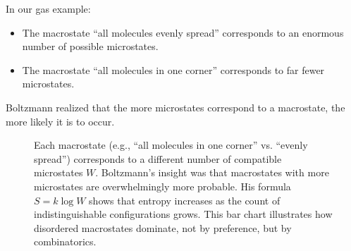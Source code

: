 In our gas example:
\begin{itemize}
  \item The macrostate “all molecules evenly spread” corresponds to an enormous number of possible microstates.
  \item The macrostate “all molecules in one corner” corresponds to far fewer microstates.
\end{itemize}

Boltzmann realized that the more microstates correspond to a macrostate, the more likely it is to occur. 






\begin{figure}[H]
\centering
{}
\caption{
Each macrostate (e.g., “all molecules in one corner” vs. “evenly spread”) corresponds to a different number of compatible microstates \( W \). Boltzmann’s insight was that macrostates with more microstates are overwhelmingly more probable. His formula \( S = k \log W \) shows that entropy increases as the count of indistinguishable configurations grows. This bar chart illustrates how disordered macrostates dominate, not by preference, but by combinatorics.
}
\end{figure}






